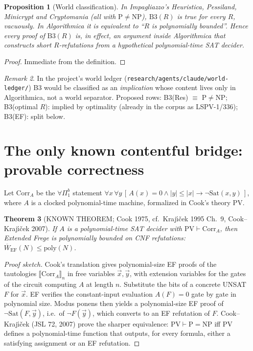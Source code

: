 \documentclass[11pt]{article}
\newtheorem{theorem}{Theorem}
\newtheorem{proposition}[theorem]{Proposition}
\theoremstyle{definition}
\theoremstyle{remark}
\newtheorem{remark}[theorem]{Remark}
\begin{document}
\begin{proposition}[World classification]\label{world}
In Impagliazzo's Heuristica, Pessiland, Minicrypt and Cryptomania (all with $\mathrm{P}\ne\mathrm{NP}$), $\mathrm{B3}(R)$ is true for every $R$, vacuously. In Algorithmica it is equivalent to ``$R$ is polynomially bounded''. Hence every proof of $\mathrm{B3}(R)$ is, in effect, an argument inside Algorithmica that constructs short $R$-refutations from a hypothetical polynomial-time SAT decider.
\end{proposition}
\begin{proof}Immediate from the definition.\end{proof}
\begin{remark}
In the project's world ledger (\texttt{research/agents/claude/world-ledger/}) B3 would be classified as an \emph{implication} whose content lives only in Algorithmica, not a world separator. Proposed rows: B3(Res) $\equiv$ P$\ne$NP; B3(optimal $R$): implied by optimality (already in the corpus as LSPV-1/336); B3(EF): split below.
\end{remark}

\section{The only known contentful bridge: provable correctness}
Let $\mathrm{Corr}_A$ be the $\forall\Pi^b_1$ statement
$\forall x\,\forall y\,[\,A(x)=0\wedge |y|\le|x|\to \neg\mathrm{Sat}(x,y)\,]$, where $A$ is a clocked polynomial-time machine, formalized in Cook's theory PV.

\begin{theorem}[KNOWN THEOREM; Cook 1975, cf.\ Kraj\'{\i}\v{c}ek 1995 Ch.~9, Cook--Kraj\'{\i}\v{c}ek 2007]\label{pvbridge}
If $A$ is a polynomial-time SAT decider with $\mathrm{PV}\vdash\mathrm{Corr}_A$, then Extended Frege is polynomially bounded on CNF refutations: $\overline W_{\mathrm{EF}}(N)\le \mathrm{poly}(N)$.
\end{theorem}
\begin{proof}[Proof sketch]
Cook's translation gives polynomial-size EF proofs of the tautologies $\llbracket\mathrm{Corr}_A\rrbracket_n$ in free variables $\vec x,\vec y$, with extension variables for the gates of the circuit computing $A$ at length $n$. Substitute the bits of a concrete UNSAT $F$ for $\vec x$. EF verifies the constant-input evaluation $A(F)=0$ gate by gate in polynomial size. Modus ponens then yields a polynomial-size EF proof of $\neg\mathrm{Sat}(F,\vec y)$, i.e.\ of $\neg F(\vec y)$, which converts to an EF refutation of $F$. Cook--Kraj\'{\i}\v{c}ek (JSL 72, 2007) prove the sharper equivalence: $\mathrm{PV}\vdash \mathrm{P}=\mathrm{NP}$ iff PV defines a polynomial-time function that outputs, for every formula, either a satisfying assignment or an EF refutation.
\end{proof}
\end{document}
